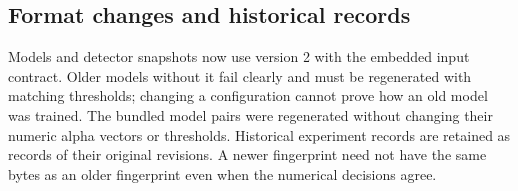 \subsection{Format changes and historical records}

Models and detector snapshots now use version 2 with the embedded input
contract. Older models without it fail clearly and must be regenerated with
matching thresholds; changing a configuration cannot prove how an old model was
trained. The bundled model pairs were regenerated without changing their
numeric alpha vectors or thresholds. Historical experiment records are retained
as records of their original revisions. A newer fingerprint need not have the
same bytes as an older fingerprint even when the numerical decisions agree.
